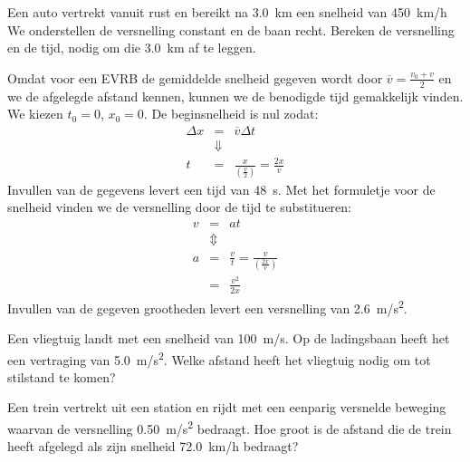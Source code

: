 \documentclass{ximera}
\begin{document}
\begin{exercise}
    Een auto vertrekt vanuit rust en bereikt na \SI{3,0}{km} een snelheid van \SI{450}{km/h} We onderstellen de versnelling constant en de baan recht. Bereken de versnelling en de tijd, nodig om die \SI{3,0}{km} af te leggen.
    \begin{oplossing}
    Omdat voor een EVRB de gemiddelde snelheid gegeven wordt door $\overline{v}=\frac{v_0+v}{2}$ en we de afgelegde afstand kennen, kunnen we de benodigde tijd gemakkelijk vinden. We kiezen $t_0=0$, $x_0=0$. De beginsnelheid is nul zodat:
    \begin{eqnarray*}
    \Delta x &=& \overline{v}\Delta t \\
    &\Downarrow & \\
    t &=& \frac{x}{\left(\frac{v}{2}\right)} = \frac{2x}{v}
    \end{eqnarray*}
    Invullen van de gegevens levert een tijd van \SI{48}{s}. Met het formuletje voor de snelheid vinden we de versnelling door de tijd te substitueren:
    \begin{eqnarray*}
    v &=& at \\
    &\Updownarrow&\\
    a &=& \frac{v}{t}=\frac{v}{\left(\frac{2x}{v}\right)}\\
    &=& \frac{v^2}{2x}
    \end{eqnarray*}
    Invullen van de gegeven grootheden levert een versnelling van \SI{2,6}{m/s^2}.
    \end{oplossing}
\end{exercise}

\begin{exercise}
    Een vliegtuig landt met een snelheid van \SI{100}{m/s}. Op de ladingsbaan heeft het een vertraging van \SI{5,0}{m/s^2}. Welke afstand heeft het vliegtuig nodig om tot stilstand te komen?
\end{exercise}

\begin{exercise}
    Een trein vertrekt uit een station en rijdt met een eenparig versnelde beweging waarvan de versnelling \SI{0,50}{m/s^2} bedraagt. Hoe groot is de afstand die de trein heeft afgelegd als zijn snelheid \SI{72,0}{km/h} bedraagt?
\end{exercise}
\end{document}
